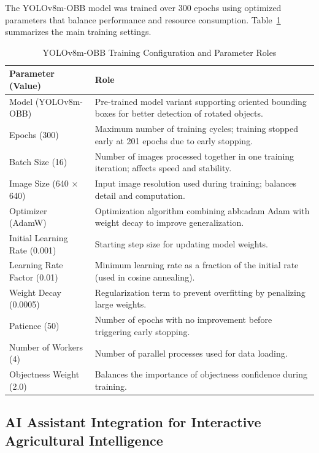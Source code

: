 The YOLOv8m-OBB model was trained over 300 epochs using optimized parameters that balance performance and resource consumption. Table~\ref{tab:train-config} summarizes the main training settings.
\begin{table}[H]
    \caption{YOLOv8m-OBB Training Configuration and Parameter Roles}
    \centering
    \begin{tabular}{|p{6cm}|p{9cm}|}
    \hline
    \textbf{Parameter (Value)} & \textbf{Role} \\
    \hline
    Model (YOLOv8m-OBB) & Pre-trained model variant supporting oriented bounding boxes for better detection of rotated objects. \\
    \hline
    Epochs (300) & Maximum number of training cycles; training stopped early at 201 epochs due to early stopping. \\
    \hline
    Batch Size (16) & Number of images processed together in one training iteration; affects speed and stability. \\
    \hline
    Image Size (640 × 640) & Input image resolution used during training; balances detail and computation. \\
    \hline
    Optimizer (AdamW) & Optimization algorithm combining \gls{abb:adam} Adam with weight decay to improve generalization. \\
    \hline
    Initial Learning Rate (0.001) & Starting step size for updating model weights. \\
    \hline
    Learning Rate Factor (0.01) & Minimum learning rate as a fraction of the initial rate (used in cosine annealing). \\
    \hline
    Weight Decay (0.0005) & Regularization term to prevent overfitting by penalizing large weights. \\
    \hline
    Patience (50) & Number of epochs with no improvement before triggering early stopping. \\
    \hline
    Number of Workers (4) & Number of parallel processes used for data loading. \\
    \hline
    Objectness Weight (2.0) & Balances the importance of objectness confidence during training. \\
    \hline
    \end{tabular}
    \label{tab:train-config}
\end{table}
  


\subsection{AI Assistant Integration for Interactive Agricultural Intelligence}

